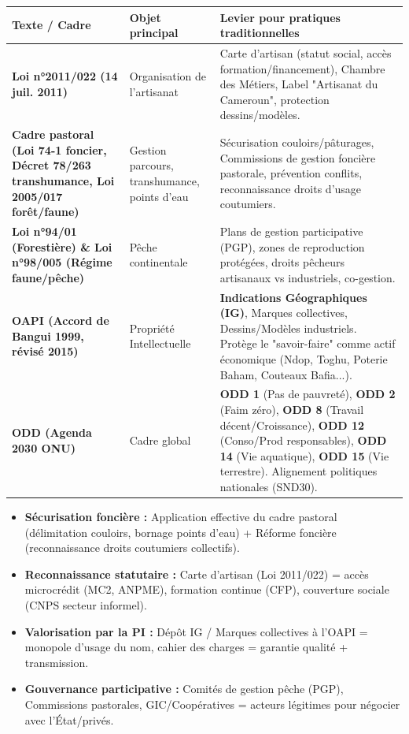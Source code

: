 \documentclass[11pt]{article}
\begin{document}
\begin{center}
\begin{tabularx}{\linewidth}{|l|X|X|}\hline
\rowcolor{popblueL}
\textbf{Texte / Cadre} & \textbf{Objet principal} & \textbf{Levier pour pratiques traditionnelles} \\ \hline
\textbf{Loi n°2011/022 (14 juil. 2011)} & Organisation de l'artisanat & Carte d'artisan (statut social, accès formation/financement), Chambre des Métiers, Label "Artisanat du Cameroun", protection dessins/modèles. \\ \hline
\textbf{Cadre pastoral (Loi 74-1 foncier, Décret 78/263 transhumance, Loi 2005/017 forêt/faune)} & Gestion parcours, transhumance, points d'eau & Sécurisation couloirs/pâturages, Commissions de gestion foncière pastorale, prévention conflits, reconnaissance droits d'usage coutumiers. \\ \hline
\textbf{Loi n°94/01 (Forestière) \& Loi n°98/005 (Régime faune/pêche)} & Pêche continentale & Plans de gestion participative (PGP), zones de reproduction protégées, droits pêcheurs artisanaux vs industriels, co-gestion. \\ \hline
\textbf{OAPI (Accord de Bangui 1999, révisé 2015)} & Propriété Intellectuelle & \textbf{Indications Géographiques (IG)}, Marques collectives, Dessins/Modèles industriels. Protège le "savoir-faire" comme actif économique (Ndop, Toghu, Poterie Baham, Couteaux Bafia...). \\ \hline
\textbf{ODD (Agenda 2030 ONU)} & Cadre global & \textbf{ODD 1} (Pas de pauvreté), \textbf{ODD 2} (Faim zéro), \textbf{ODD 8} (Travail décent/Croissance), \textbf{ODD 12} (Conso/Prod responsables), \textbf{ODD 14} (Vie aquatique), \textbf{ODD 15} (Vie terrestre). Alignement politiques nationales (SND30). \\ \hline
\end{tabularx}
\end{center}

\begin{aretenir}
\begin{itemize}
    \item \textbf{Sécurisation foncière :} Application effective du cadre pastoral (délimitation couloirs, bornage points d'eau) + Réforme foncière (reconnaissance droits coutumiers collectifs).
    \item \textbf{Reconnaissance statutaire :} Carte d'artisan (Loi 2011/022) = accès microcrédit (MC2, ANPME), formation continue (CFP), couverture sociale (CNPS secteur informel).
    \item \textbf{Valorisation par la PI :} Dépôt IG / Marques collectives à l'OAPI = monopole d'usage du nom, cahier des charges = garantie qualité + transmission.
    \item \textbf{Gouvernance participative :} Comités de gestion pêche (PGP), Commissions pastorales, GIC/Coopératives = acteurs légitimes pour négocier avec l'État/privés.
\end{itemize}
\end{aretenir}
\end{document}
